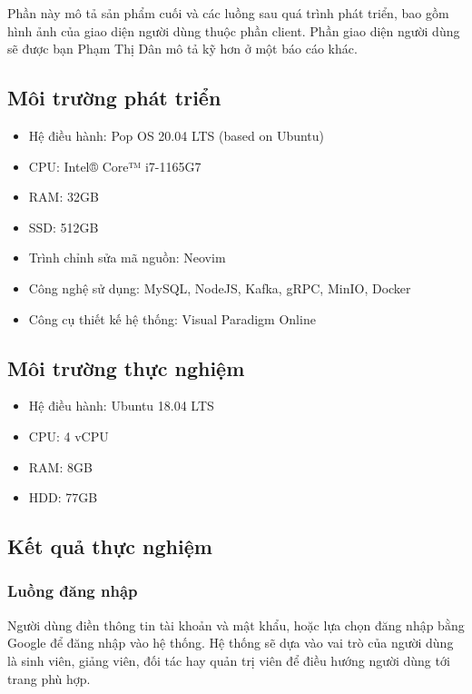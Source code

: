 \documentclass[./../main.tex]{subfiles}
\begin{document}
Phần này mô tả sản phẩm cuối và các luồng sau quá trình phát triển, bao gồm hình ảnh của giao diện người dùng thuộc phần client. Phần giao diện người dùng sẽ được bạn Phạm Thị Dân mô tả kỹ hơn ở một báo cáo khác.

\subsection{Môi trường phát triển}

\begin{itemize}
	\item Hệ điều hành: Pop OS 20.04 LTS (based on Ubuntu)
	\item CPU: Intel® Core™ i7-1165G7
	\item RAM: 32GB
	\item SSD: 512GB
	\item Trình chỉnh sửa mã nguồn: Neovim
	\item Công nghệ sử dụng: MySQL, NodeJS, Kafka, gRPC, MinIO, Docker
	\item Công cụ thiết kế hệ thống: Visual Paradigm Online
\end{itemize}

\subsection{Môi trường thực nghiệm}

\begin{itemize}
	\item Hệ điều hành: Ubuntu 18.04 LTS
	\item CPU: 4 vCPU
	\item RAM: 8GB
	\item HDD: 77GB
\end{itemize}

\subsection{Kết quả thực nghiệm}

\subsubsection{Luồng đăng nhập}

Người dùng điền thông tin tài khoản và mật khẩu, hoặc lựa chọn đăng nhập
bằng Google để đăng nhập vào hệ thống. Hệ thống sẽ dựa vào vai trò của
người dùng là sinh viên, giảng viên, đối tác hay quản trị viên để điều
hướng người dùng tới trang phù hợp.
\end{document}
